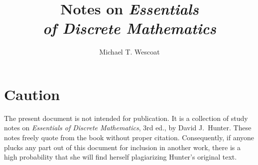 \documentclass[12pt]{book}
\begin{document}
\frontmatter

\title{Notes on \emph{Essentials\\of Discrete Mathematics}}
\author{Michael T. Wescoat}
\maketitle

\tableofcontents

\chapter*{Caution}

The present document is not intended for publication.
It is a collection of study notes on \emph{Essentials of Discrete Mathematics}, 3rd ed., by David J.\ Hunter.
These notes freely quote from the book without proper citation.
Consequently, if anyone plucks any part out of this document for inclusion in another work, there is a high probability that she will find herself plagiarizing Hunter's original text.

\mainmatter







\end{document}
